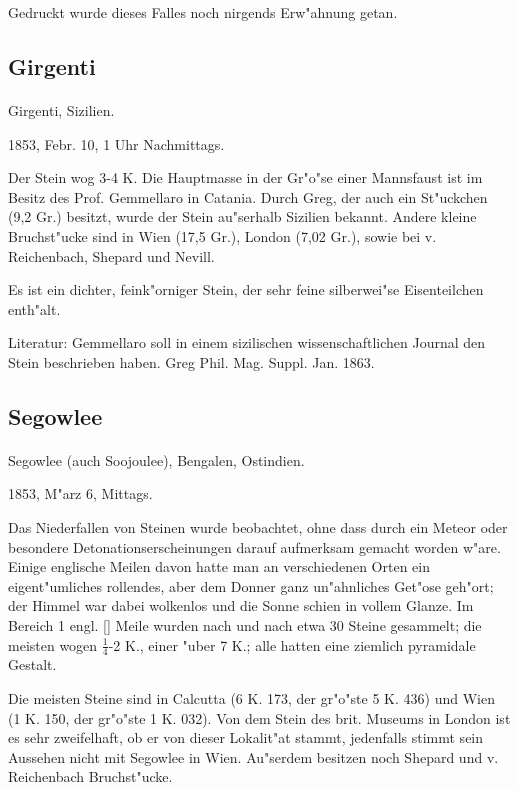 \documentclass[a4paper, 11pt, oneside]{article}
\begin{document}
Gedruckt wurde dieses Falles noch nirgends Erw"ahnung getan.

\subsection{Girgenti}
\normalsize
\paragraph{}
Girgenti, Sizilien.

1853, Febr. 10, 1 Uhr Nachmittags.

Der Stein wog 3-4 K. Die Hauptmasse in der Gr"o"se einer Mannsfaust ist im Besitz des Prof. Gemmellaro in Catania. Durch Greg, der auch ein St"uckchen (9,2 Gr.) besitzt, wurde der Stein au"serhalb Sizilien bekannt. Andere kleine Bruchst"ucke sind in Wien (17,5 Gr.), London (7,02 Gr.), sowie bei v. Reichenbach, Shepard und Nevill.

Es ist ein dichter, feink"orniger Stein, der sehr feine silberwei"se Eisenteilchen enth"alt.

\footnotesize
Literatur: Gemmellaro soll in einem sizilischen wissenschaftlichen Journal den Stein beschrieben haben. Greg Phil. Mag. Suppl. Jan. 1863.

\subsection{Segowlee}
\normalsize
\paragraph{}
Segowlee (auch Soojoulee), Bengalen, Ostindien.

1853, M"arz 6, Mittags.

Das Niederfallen von Steinen wurde beobachtet, ohne dass durch ein Meteor oder besondere Detonationserscheinungen darauf aufmerksam gemacht worden w"are. Einige englische Meilen davon hatte man an verschiedenen Orten ein eigent"umliches rollendes, aber dem Donner ganz un"ahnliches Get"ose geh"ort; der Himmel war dabei wolkenlos und die Sonne schien in vollem Glanze. Im Bereich 1 engl. [] Meile wurden nach und nach etwa 30 Steine gesammelt; die meisten wogen $\frac{1}{4}$-2 K., einer "uber 7 K.; alle hatten eine ziemlich pyramidale Gestalt.

Die meisten Steine sind in Calcutta (6 K. 173, der gr"o"ste 5 K. 436) und Wien (1 K. 150, der gr"o"ste 1 K. 032). Von dem Stein des brit. Museums in London ist es sehr zweifelhaft, ob er von dieser Lokalit"at stammt, jedenfalls stimmt sein Aussehen nicht mit Segowlee in Wien. Au"serdem besitzen noch Shepard und v. Reichenbach Bruchst"ucke.
\end{document}

